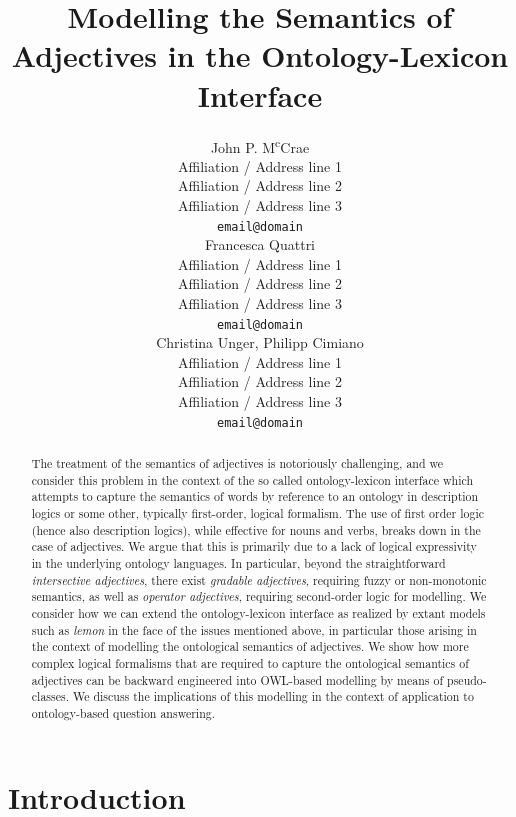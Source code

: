 \documentclass[11pt]{article}
\title{Modelling the Semantics of Adjectives in the Ontology-Lexicon Interface}
\author{John P. M\textsuperscript{c}Crae\\
  Affiliation / Address line 1 \\
  Affiliation / Address line 2 \\
  Affiliation / Address line 3 \\
  {\tt email@domain} \\\And
  Francesca Quattri \\
  Affiliation / Address line 1 \\
  Affiliation / Address line 2 \\
  Affiliation / Address line 3 \\
  {\tt email@domain} \\\And
  Christina Unger, Philipp Cimiano \\
  Affiliation / Address line 1 \\
  Affiliation / Address line 2 \\
  Affiliation / Address line 3 \\
{\tt email@domain}}
\date{}
\begin{document}
\maketitle
\begin{abstract}
The treatment of the semantics of adjectives is notoriously challenging, and we consider this problem in the context of the so called ontology-lexicon interface which attempts to capture the semantics of words by reference to an ontology in description logics or some other, typically first-order, logical formalism.
The use of first order logic (hence also description logics),
while effective for nouns and verbs, breaks down in the case of adjectives. 
We argue that this is primarily due to a lack of logical expressivity in the 
underlying ontology languages. In particular, beyond the straightforward \emph{intersective adjectives}, there exist \emph{gradable adjectives}, requiring fuzzy or
non-monotonic semantics, as well as \emph{operator adjectives}, requiring second-order logic for modelling. 
We consider how we can extend the ontology-lexicon interface as realized by extant models such as \emph{lemon} in the face of the issues mentioned above, in particular those arising in the context of modelling the ontological semantics of adjectives. We show how more complex logical formalisms that are required to capture the ontological semantics of adjectives can be backward 
engineered into OWL-based modelling by means of pseudo-classes. We discuss the implications of this modelling in the context of application to ontology-based question answering.
\end{abstract}



\section{Introduction}
\label{intro}
\end{document}
